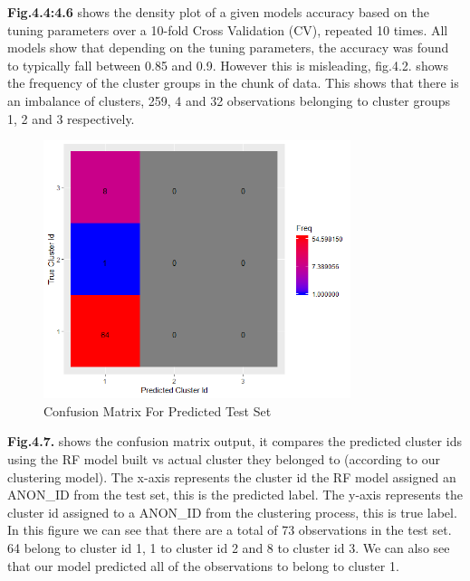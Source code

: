 \textbf{Fig.4.4:4.6} shows the density plot of a given models accuracy based on the tuning parameters over a 10-fold Cross Validation (CV), repeated 10 times. All models show that depending on the tuning parameters, the accuracy was found to typically fall between 0.85 and 0.9. However this is misleading, fig.4.2. shows the frequency of the cluster groups in the chunk of data. This shows that there is an imbalance of clusters, 259, 4 and 32 observations belonging to cluster groups 1, 2 and 3 respectively.

\begin{figure}[H]
\centering     
\includegraphics[width=0.8\textwidth]{Figures/results/confusion_matrix.png}
\caption{Confusion Matrix For Predicted Test Set}
\label{fig:Dendrogram}
\end{figure} 

\textbf{Fig.4.7.} shows the confusion matrix output, it compares the predicted cluster ids using the RF model built vs actual cluster they belonged to (according to our clustering model). The x-axis represents the cluster id the RF model assigned an ANON\_ID from the test set, this is the predicted label. The y-axis represents the cluster id assigned to a ANON\_ID from the clustering process, this is true label. In this figure we can see that there are a total of 73 observations in the test set. 64 belong to cluster id 1, 1 to cluster id 2 and 8 to cluster id 3. We can also see that our model predicted all of the observations to belong to cluster 1.